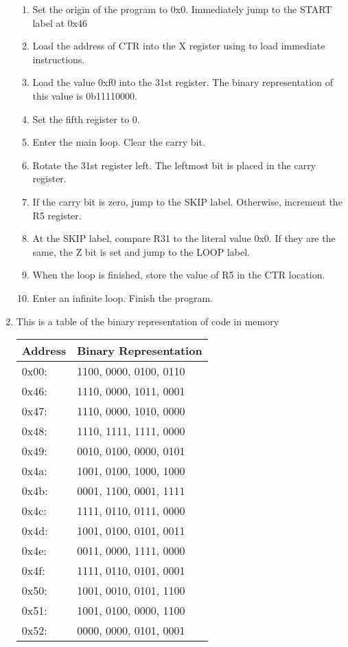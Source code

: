 \documentclass[12pt,letterpaper]{article}
\begin{document}
\begin{enumerate}
    \begin{enumerate}[i]
    \item Set the origin of the program to 0x0. Immediately jump to the START
    label at 0x46
    \item Load the address of CTR into the X register using to load immediate
    instructions.
    \item Load the value 0xf0 into the 31st register. The binary representation
    of this value is 0b11110000.
    \item Set the fifth register to 0.
    \item Enter the main loop. Clear the carry bit.
    \item Rotate the 31st register left. The leftmost bit is placed in the
    carry register.
    \item If the carry bit is zero, jump to the SKIP label. Otherwise,
    increment the R5 register.
    \item At the SKIP label, compare R31 to the literal value 0x0. If they are
    the same, the Z bit is set and jump to the LOOP label.
    \item When the loop is finished, store the value of R5 in the CTR location.
    \item Enter an infinite loop. Finish the program.

    \end{enumerate}

    \item This is a table of the binary representation of code in memory\\
    \begin{tabular}{l l}
        Address & Binary Representation \\
        \hline
        0x00: & 1100, 0000, 0100, 0110 \\
        0x46: & 1110, 0000, 1011, 0001 \\
        0x47: & 1110, 0000, 1010, 0000 \\
        0x48: & 1110, 1111, 1111, 0000 \\
        0x49: & 0010, 0100, 0000, 0101 \\
        0x4a: & 1001, 0100, 1000, 1000 \\
        0x4b: & 0001, 1100, 0001, 1111 \\
        0x4c: & 1111, 0110, 0111, 0000 \\
        0x4d: & 1001, 0100, 0101, 0011 \\
        0x4e: & 0011, 0000, 1111, 0000 \\
        0x4f: & 1111, 0110, 0101, 0001 \\
        0x50: & 1001, 0010, 0101, 1100 \\
        0x51: & 1001, 0100, 0000, 1100 \\
        0x52: & 0000, 0000, 0101, 0001 \\
    \end{tabular}
\end{enumerate}
\end{document}

